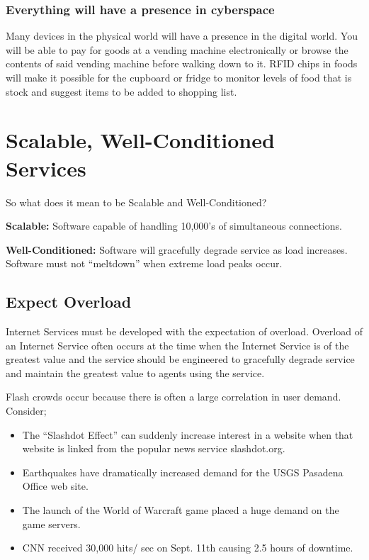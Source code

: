 \documentclass[a4paper]{article}
\begin{document}
\subsubsection{Everything will have a presence in cyberspace}

Many devices in the physical world will have a presence in the digital world. You will be able to pay for goods at a vending machine electronically or browse the contents of said vending machine before walking down to it. RFID chips in foods will make it possible for the cupboard or fridge to monitor levels of food that is stock and suggest items to be added to shopping list.

\section{Scalable, Well-Conditioned Services}

So what does it mean to be Scalable and Well-Conditioned? 

\begin{description}
\item \textbf{Scalable:} Software capable of handling 10,000's of simultaneous connections.
\item \textbf{Well-Conditioned:} Software will gracefully degrade service as load increases. Software must not ``meltdown'' when extreme load peaks occur.
\end{description}

\subsection{Expect Overload}

Internet Services must be developed with the expectation of overload. Overload of an Internet Service often occurs at the time when the Internet Service is of the greatest value and the service should be engineered to gracefully degrade service and maintain the greatest value to agents using the service. 

Flash crowds occur because there is often a large correlation in user demand. Consider;

\begin{itemize}
	\item The ``Slashdot Effect'' can suddenly increase interest in a website when that website is linked from the popular news service slashdot.org.
	\item Earthquakes have dramatically increased demand for the USGS Pasadena Office web site.
	\item The launch of the World of Warcraft game placed a huge demand on the game servers.
	\item CNN received 30,000 hits/ sec on Sept. 11th causing 2.5 hours of downtime.
\end{itemize}
\end{document}
